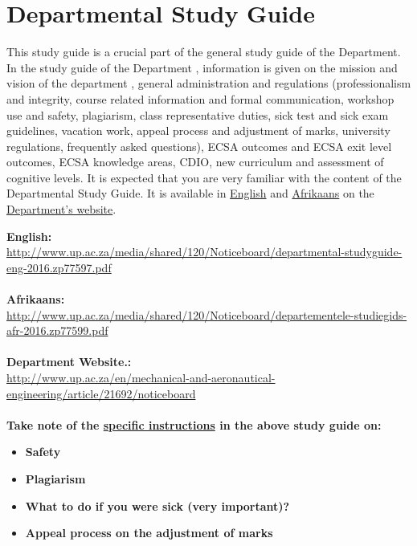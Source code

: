 \section{Departmental Study Guide} \label{sec:dep_study_guide}
    This study guide is a crucial part of the general study guide of the
    Department. In the study guide of the Department , information is given on
    the mission and vision of the department , general administration and
    regulations (professionalism and integrity, course related information and
    formal communication, workshop use and safety, plagiarism, class
    representative duties, sick test and sick exam guidelines, vacation work,
    appeal process and adjustment of marks, university regulations, frequently
    asked questions), ECSA outcomes and ECSA exit level outcomes, ECSA
    knowledge areas, CDIO, new curriculum and assessment of cognitive levels.
    It is expected that you are very familiar with the content of the
    Departmental Study Guide. It is available in
    \href{http://www.up.ac.za/media/shared/120/Noticeboard/departmental-studyguide-eng-2016.zp77597.pdf}{English}
    and
    \href{http://www.up.ac.za/media/shared/120/Noticeboard/departementele-studiegids-afr-2016.zp77599.pdf}{Afrikaans}
    on the
    \href{http://www.up.ac.za/en/mechanical-and-aeronautical-engineering/article/21692/noticeboard}{Department’s website}.


    \noindent
    \textbf{English:} \\
    \url{http://www.up.ac.za/media/shared/120/Noticeboard/departmental-studyguide-eng-2016.zp77597.pdf} \\~\\
    \textbf{Afrikaans:} \\
    \url{http://www.up.ac.za/media/shared/120/Noticeboard/departementele-studiegids-afr-2016.zp77599.pdf} \\~\\
    \textbf{Department Website.:} \\
    \url{http://www.up.ac.za/en/mechanical-and-aeronautical-engineering/article/21692/noticeboard} \\~\\

    \noindent
    \textbf{Take note of the \uline{specific instructions} in the above study guide on:}
    \begin{itemize}
        \item \textbf{Safety}
        \item \textbf{Plagiarism}
        \item \textbf{What to do if you were sick (very important)?}
        \item \textbf{Appeal process on the adjustment of marks}
    \end{itemize}


